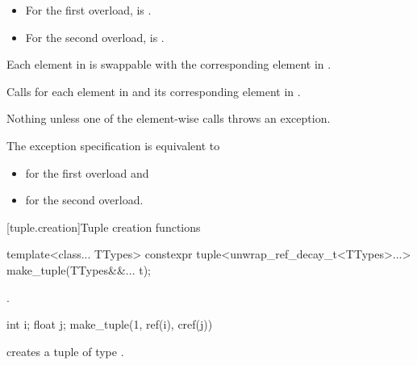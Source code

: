 \documentclass{wg21}
\begin{document}
\begin{itemdescr}
    \pnum
    \mandates
    \begin{itemize}
        \item
        For the first overload,
         is .
        \item
        For the second overload,
         is .
    \end{itemize}
    
    \pnum
    \expects
    Each element in  is swappable with
    the corresponding element in .
    
    \pnum
    \effects
    Calls  for each element in  and its
    corresponding element in .
    
    \pnum
    \throws
    Nothing unless one of the element-wise  calls throws an exception.
    
    \pnum
    \remarks
    The exception specification is equivalent to
    \begin{itemize}
        \item
         for the first overload and
        \item
         for the second overload.
    \end{itemize}
\end{itemdescr}

[tuple.creation]{Tuple creation functions}

%
%
\begin{itemdecl}
    template<class... TTypes>
    constexpr tuple<unwrap_ref_decay_t<TTypes>...> make_tuple(TTypes&&... t);
\end{itemdecl}

\begin{itemdescr}
    \pnum
    \returns
    .
    
    \pnum
    \begin{example}
        \begin{codeblock}
            int i; float j;
            make_tuple(1, ref(i), cref(j))
        \end{codeblock}
        creates a tuple of type .
    \end{example}
\end{itemdescr}
\end{document}

